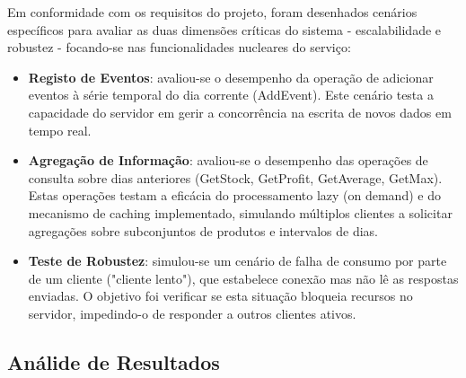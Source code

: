 \documentclass[11pt, a4paper, fleqn]{article}
\begin{document}
	Em conformidade com os requisitos do projeto, foram desenhados cenários específicos para avaliar as duas dimensões críticas do sistema - escalabilidade e robustez - focando-se nas funcionalidades nucleares do serviço:
	\begin{itemize}
		\item \textbf{Registo de Eventos}: avaliou-se o desempenho da operação de adicionar eventos à série temporal do dia corrente (AddEvent). Este cenário testa a capacidade do servidor em gerir a concorrência na escrita de novos dados em tempo real.
		\item \textbf{Agregação de Informação}: avaliou-se o desempenho das operações de consulta sobre dias anteriores (GetStock, GetProfit, GetAverage, GetMax). Estas operações testam a eficácia do processamento lazy (on demand) e do mecanismo de caching implementado, simulando múltiplos clientes a solicitar agregações sobre subconjuntos de produtos e intervalos de dias.
		\item \textbf{Teste de Robustez}: simulou-se um cenário de falha de consumo por parte de um cliente ("cliente lento"), que estabelece conexão mas não lê as respostas enviadas. O objetivo foi verificar se esta situação bloqueia recursos no servidor, impedindo-o de responder a outros clientes ativos.
	\end{itemize}
	
	\subsection{Análide de Resultados}
	
\end{document}
